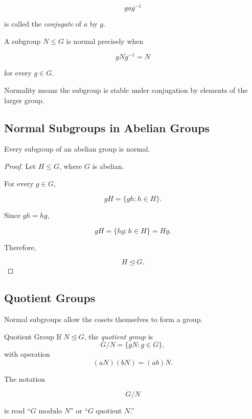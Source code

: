 \[ gag^{-1} \]

is called the \emph{conjugate} of \(a\) by \(g\).

A subgroup \(N\leq G\) is normal precisely when

\[ gNg^{-1}=N \]

for every \(g\in G\).

Normality means the subgroup is stable under conjugation by elements of the
larger group.

\subsection{Normal Subgroups in Abelian Groups}
\label{subsec:normal-abelian}

\begin{theorem}
Every subgroup of an abelian group is normal.
\end{theorem}

\begin{proof}
Let \(H\leq G\), where \(G\) is abelian.

For every \(g\in G\),

\[ gH=\{gh:h\in H\}. \]

Since \(gh=hg\),

\[ gH=\{hg:h\in H\}=Hg. \]

Therefore,

\[ H\trianglelefteq G. \]
\end{proof}

\subsection{Quotient Groups}
\label{subsec:quotient-groups}

Normal subgroups allow the cosets themselves to form a group.

\begin{definitionbox}{Quotient Group}
If \(N\trianglelefteq G\), the \emph{quotient group} is
\[ G/N=\{gN:g\in G\}, \]
with operation
\[ (aN)(bN)=(ab)N. \]
\end{definitionbox}

The notation

\[ G/N \]

is read ``\(G\) modulo \(N\)'' or ``\(G\) quotient \(N\).''

